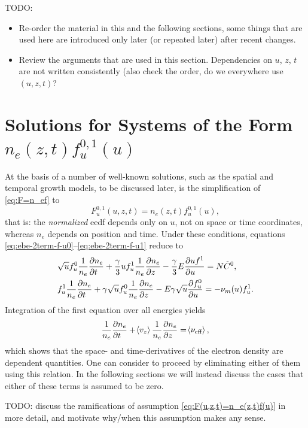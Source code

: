 \documentclass{book}
\newcommand{\MEAN}[1]{\ensuremath{\!\left\langle{{#1}}\right\rangle}}
\begin{document}
TODO:
\begin{itemize}
	\item Re-order the material in this and the following sections, some
	things that are used here are introduced only later (or repeated later)
	after recent changes.
	\item Review the arguments that are used in this section. Dependencies
	on $u$, $z$, $t$ are not written consistently (also check the order, do
	we everywhere use $(u,z,t)$?
\end{itemize}


\section{Solutions for Systems of the Form $n_e(z,t)f^{0,1}_u(u)$}

At the basis of a number of well-known solutions, such as the spatial and temporal
growth models, to be discussed later, is the simplification of \eqref{eq:F=n_ef} to
\begin{equation}
	F^{0,1}_u(u,z,t)=n_e(z,t)f^{0,1}_u(u),
	\label{eq:F(u,z,t)=n_e(z,t)f(u)}
\end{equation}
that is: the {\em normalized} eedf depends only on $u$, not on space or time coordinates,
whereas $n_e$ depends on position and time. Under these conditions,
equations \eqref{eq:ebe-2term-f-u0}--\eqref{eq:ebe-2term-f-u1} reduce to
\begin{align}
	&\sqrt{u}f^0_u\frac{1}{n_e}\PDEV{n_e}{t}
	+ \frac{\gamma}{3}uf^1_u\frac{1}{n_e}\PDEV{n_e}{z}
	- \frac{\gamma}{3}E\PDEV{u f^1}{u}
	=  N\tilde{C}^0,
	\label{eq:ebe-2term-f-u0(u)} \\
	&f^1_u\frac{1}{n_e}\PDEV{n_e}{t}
	+ \gamma \sqrt{u}f^0_u\frac{1}{n_e}\PDEV{n_e}{z}
	- E\gamma \sqrt{u}\PDEV{f^0_u}{u}
	= -\nu_m(u)f^1_u.
	\label{eq:ebe-2term-f-u1(u)}
\end{align}
Integration of the first equation over all energies yields
\begin{equation}
	\frac{1}{n_e}\PDEV{n_e}{t}
	+ \MEAN{v_z}\frac{1}{n_e}\PDEV{n_e}{z}
	=  \MEAN{\nu_{\text{eff}}},
	\label{eq:t-spat-constraint}
\end{equation}
which shows that the space- and time-derivatives of the electron density are dependent
quantities. One can consider to proceed by eliminating either of them using this
relation. In the following sections we will instead discuss the cases that either of these
terms is assumed to be zero.

TODO: discuss the ramifications of assumption \eqref{eq:F(u,z,t)=n_e(z,t)f(u)} in more
detail, and motivate why/when this assumption makes any sense.
\end{document}
